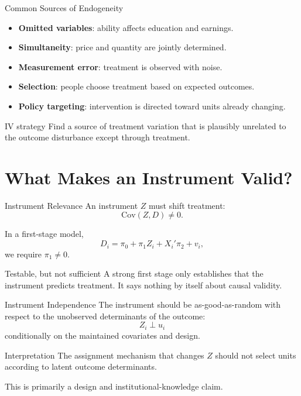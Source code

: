 \documentclass[aspectratio=169,11pt]{beamer}
\newcommand{\Cov}{\mathrm{Cov}}
\begin{document}
\begin{frame}{Common Sources of Endogeneity}
\begin{itemize}
\item \textbf{Omitted variables}: ability affects education and earnings.
\item \textbf{Simultaneity}: price and quantity are jointly determined.
\item \textbf{Measurement error}: treatment is observed with noise.
\item \textbf{Selection}: people choose treatment based on expected outcomes.
\item \textbf{Policy targeting}: intervention is directed toward units already changing.
\end{itemize}

\begin{block}{IV strategy}
Find a source of treatment variation that is plausibly unrelated to the outcome disturbance except through treatment.
\end{block}
\end{frame}

\section{What Makes an Instrument Valid?}

\begin{frame}{Instrument Relevance}
An instrument \(Z\) must shift treatment:
\[
\Cov(Z,D)\neq 0.
\]

In a first-stage model,
\[
D_i=\pi_0+\pi_1Z_i+X_i'\pi_2+v_i,
\]
we require \(\pi_1\neq 0\).

\begin{alertblock}{Testable, but not sufficient}
A strong first stage only establishes that the instrument predicts treatment. It says nothing by itself about causal validity.
\end{alertblock}
\end{frame}

\begin{frame}{Instrument Independence}
The instrument should be as-good-as-random with respect to the unobserved determinants of the outcome:
\[
Z_i\perp u_i
\]
conditionally on the maintained covariates and design.

\begin{block}{Interpretation}
The assignment mechanism that changes \(Z\) should not select units according to latent outcome determinants.
\end{block}

This is primarily a design and institutional-knowledge claim.
\end{frame}
\end{document}
